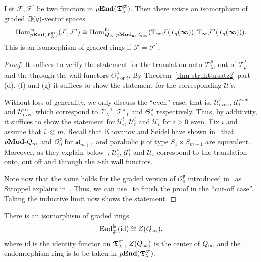 \begin{prop}\label{prop-endograd2}
Let $\mathcal F,\mathcal F^{\prime}$ be two 
functors in $p\boldsymbol{\mathrm{End}}(\boldsymbol{\mathfrak{T}}_{\lambda}^{\mathrm{gr}})$. Then there exists 
an isomorphism of graded $\mathbb{Q}(q)$-vector spaces
\[
\mathrm{Hom}^{\mathrm{fs}}_{p\boldsymbol{\mathrm{End}}(\boldsymbol{\mathfrak{T}}_{\lambda}^{\mathrm{gr}})}(\mathcal F,\mathcal F^{\prime})\cong \mathrm{Hom}^{\mathrm{fs}}_{Q_{\infty}\text{-}p\boldsymbol{\mathrm{Mod}}_{\mathrm{gr}}\text{-}Q_{\infty}}(\mathbb{T}_{\infty}\mathcal F(T_q({\boldsymbol{\infty}})),\mathbb{T}_{\infty}\mathcal F^{\prime}(T_q({\boldsymbol{\infty}}))).
\]
This is an isomorphism of graded rings if $\mathcal F=\mathcal F^{\prime}$.\makeqed
\end{prop}



\begin{proof}
It 
suffices to verify the statement for the 
translation onto $\mathcal T^{\mu}_{\lambda}$, 
out of $\mathcal T_{\mu}^{\lambda}$ and the 
through the wall functors $\Theta^{\lambda}_{s\text{ or }t}$. 
By Theorem~\ref{thm-struktursatz2} part (d), (f) and (g) 
it suffices to show the statement for the corresponding $\mathcal U$'s.



Without loss of generality, we only discuss the 
``even'' case, that is, $\mathcal U^t_{\mathrm{even}}$, $\mathcal U_t^{\mathrm{even}}$ 
and $\mathcal U^{\infty}_{\mathrm{even}}$ which correspond to 
$\mathcal T^{-1}_{\lambda}$, $\mathcal T_{-1}^{\lambda}$ and 
$\Theta^{\lambda}_{s}$ respectively. Thus, by additivity, it 
suffices to show the statement for $\mathcal U^t_{i}$, 
$\mathcal U_t^{i}$ and $\mathcal U_i$ for $i>0$ even.
Fix $i$ and assume that $i\ll m$. Recall 
that Khovanov and Seidel have shown 
in~\cite[Proposition~2.9]{ks1} that 
$p\boldsymbol{\mathrm{Mod}}\text{-}Q_m$ and $\mathcal O^{\mathfrak{p}}_0$ 
for $\mathfrak{sl}_{m+1}$ and parabolic 
$\mathfrak{p}$ of type $S_1\times S_{m-1}$ 
are equivalent. Moreover, as they explain 
below~\cite[Proposition~2.9]{ks1}, 
$\mathcal U^t_{i}$, $\mathcal U_t^{i}$ and 
$\mathcal U_i$ correspond to the translation onto, out off 
and through the $i$-th wall functors.



Note now that the same holds for the graded 
version of $\mathcal O^{\mathfrak{p}}_0$ 
introduced in~\cite{st2} as Stroppel explains in~\cite[Section~1]{st1}. 
Thus, we can use~\cite[Theorem~1.12]{st1} to finish the proof in the 
``cut-off case''. Taking the inductive limit now shows the statement.
\end{proof}



\begin{cor}\label{cor-center}
There is an isomorphism of graded rings
\[
\mathrm{End}^{\mathrm{fs}}_{\mathrm{gr}}(\mathrm{id})\cong Z(Q_{\infty}),
\]
where $\mathrm{id}$ is the identity functor on 
$\boldsymbol{\mathfrak{T}}_{\lambda}^{\mathrm{gr}}$, $Z(Q_{\infty})$ is the center of 
$Q_{\infty}$ and the endomorphism ring is to be taken in $p\boldsymbol{\mathrm{End}}(\boldsymbol{\mathfrak{T}}_{\lambda}^{\mathrm{gr}})$.\makeqed
\end{cor}



